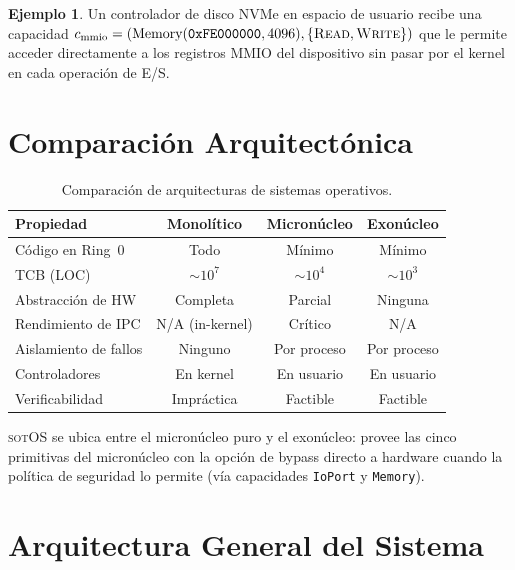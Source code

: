 \documentclass[11pt,twoside,openright]{book}
\theoremstyle{definition}
\newtheorem{example}{Ejemplo}[chapter]
\theoremstyle{plain}
\theoremstyle{remark}
\newcommand{\sotos}{\textsc{sotOS}}
\begin{document}
\begin{example}
Un controlador de disco NVMe en espacio de usuario recibe una capacidad
$c_{\text{mmio}} = (\text{Memory}(\texttt{0xFE000000}, 4096), \{\textsc{Read}, \textsc{Write}\})$
que le permite acceder directamente a los registros MMIO del dispositivo sin pasar por
el kernel en cada operación de E/S.
\end{example}

\section{Comparación Arquitectónica}

\begin{table}[ht]
\centering
\caption{Comparación de arquitecturas de sistemas operativos.}
\label{tab:comparison}
\begin{tabular}{@{}lccc@{}}
\toprule
\textbf{Propiedad} & \textbf{Monolítico} & \textbf{Micronúcleo} & \textbf{Exonúcleo} \\
\midrule
Código en Ring~0        & Todo         & Mínimo        & Mínimo \\
TCB (LOC)               & $\sim 10^7$  & $\sim 10^4$   & $\sim 10^3$ \\
Abstracción de HW       & Completa     & Parcial       & Ninguna \\
Rendimiento de IPC      & N/A (in-kernel) & Crítico    & N/A \\
Aislamiento de fallos   & Ninguno      & Por proceso   & Por proceso \\
Controladores           & En kernel    & En usuario    & En usuario \\
Verificabilidad         & Impráctica   & Factible      & Factible \\
\bottomrule
\end{tabular}
\end{table}

\sotos{} se ubica entre el micronúcleo puro y el exonúcleo: provee las cinco primitivas
del micronúcleo con la opción de bypass directo a hardware cuando la política de seguridad
lo permite (vía capacidades \texttt{IoPort} y \texttt{Memory}).

\section{Arquitectura General del Sistema}
\end{document}
